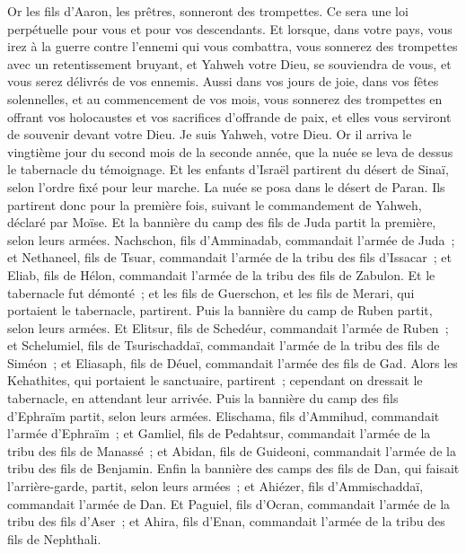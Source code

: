 \begin{multicols}{2}
Or les fils d'Aaron, les prêtres, sonneront des trompettes. Ce sera une loi perpétuelle pour vous et pour vos descendants.
Et lorsque, dans votre pays, vous irez à la guerre contre l'ennemi qui vous combattra, vous sonnerez des trompettes avec un retentissement bruyant, et Yahweh votre Dieu, se souviendra de vous, et vous serez délivrés de vos ennemis.
Aussi dans vos jours de joie, dans vos fêtes solennelles, et au commencement de vos mois, vous sonnerez des trompettes en offrant vos holocaustes et vos sacrifices d'offrande de paix, et elles vous serviront de souvenir devant votre Dieu. Je suis Yahweh, votre Dieu.
Or il arriva le vingtième jour du second mois de la seconde année, que la nuée se leva de dessus le tabernacle du témoignage.
Et les enfants d'Israël partirent du désert de Sinaï, selon l'ordre fixé pour leur marche. La nuée se posa dans le désert de Paran.
Ils partirent donc pour la première fois, suivant le commandement de Yahweh, déclaré par Moïse.
Et la bannière du camp des fils de Juda partit la première, selon leurs armées. Nachschon, fils d'Amminadab, commandait l'armée de Juda~;
et Nethaneel, fils de Tsuar, commandait l'armée de la tribu des fils d'Issacar~;
et Eliab, fils de Hélon, commandait l'armée de la tribu des fils de Zabulon.
Et le tabernacle fut démonté~; et les fils de Guerschon, et les fils de Merari, qui portaient le tabernacle, partirent.
Puis la bannière du camp de Ruben partit, selon leurs armées. Et Elitsur, fils de Schedéur, commandait l'armée de Ruben~;
et Schelumiel, fils de Tsurischaddaï, commandait l'armée de la tribu des fils de Siméon~;
et Eliasaph, fils de Déuel, commandait l'armée des fils de Gad.
Alors les Kehathites, qui portaient le sanctuaire, partirent~; cependant on dressait le tabernacle, en attendant leur arrivée.
Puis la bannière du camp des fils d'Ephraïm partit, selon leurs armées. Elischama, fils d'Ammihud, commandait l'armée d'Ephraïm~;
et Gamliel, fils de Pedahtsur, commandait l'armée de la tribu des fils de Manassé~;
et Abidan, fils de Guideoni, commandait l'armée de la tribu des fils de Benjamin.
Enfin la bannière des camps des fils de Dan, qui faisait l'arrière-garde, partit, selon leurs armées~; et Ahiézer, fils d'Ammischaddaï, commandait l'armée de Dan.
Et Paguiel, fils d'Ocran, commandait l'armée de la tribu des fils d'Aser~;
et Ahira, fils d'Enan, commandait l'armée de la tribu des fils de Nephthali.

\end{multicols}
